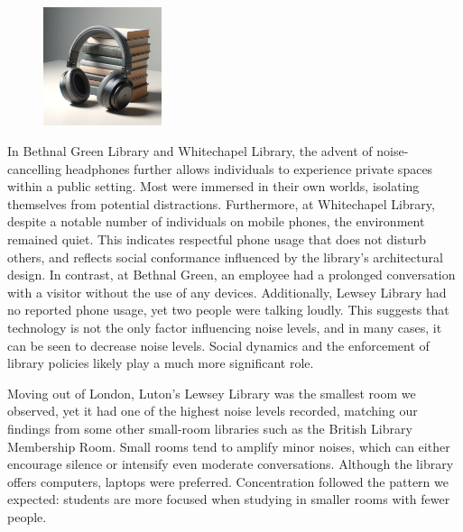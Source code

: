 \documentclass{novel}
\begin{document}
\begin{figure} 
\vspace{-\intextsep}
    \includegraphics[width=0.31\textwidth]{resources/headphones.jpg}
    \vspace{-20pt} %
\end{figure}
In Bethnal Green Library and Whitechapel Library, the advent of noise-cancelling headphones further allows individuals to experience private spaces within a public setting. Most were immersed in their own worlds, isolating themselves from potential distractions. Furthermore, at Whitechapel Library, despite a notable number of individuals on mobile phones, the environment remained quiet. This indicates respectful phone usage that does not disturb others, and reflects social conformance influenced by the library's architectural design. In contrast, at Bethnal Green, an employee had a prolonged conversation with a visitor without the use of any devices. Additionally, Lewsey Library had no reported phone usage, yet two people were talking loudly. This suggests that technology is not the only factor influencing noise levels, and in many cases, it can be seen to decrease noise levels. Social dynamics and the enforcement of library policies likely play a much more significant role.

Moving out of London, Luton's Lewsey Library was the smallest room we observed, yet it had one of the highest noise levels recorded, matching our findings from some other small-room libraries such as the British Library Membership Room. Small rooms tend to amplify minor noises, which can either encourage silence or intensify even moderate conversations. Although the library offers computers, laptops were preferred. Concentration followed the pattern we expected: students are more focused when studying in smaller rooms with fewer people. 
\end{document}
